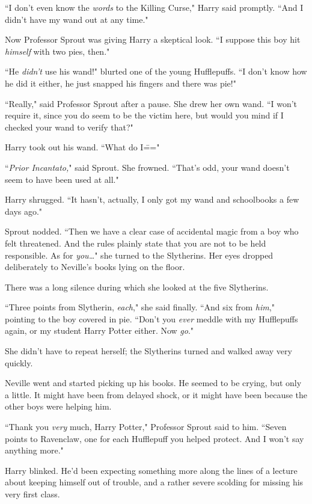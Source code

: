 ``I don't even know the \emph{words} to the Killing Curse," Harry said promptly. ``And I didn't have my wand out at any time."

Now Professor Sprout was giving Harry a skeptical look. ``I suppose this boy hit \emph{himself} with two pies, then."

``He \emph{didn't} use his wand!" blurted one of the young Hufflepuffs. ``I don't know how he did it either, he just snapped his fingers and there was pie!"

``Really," said Professor Sprout after a pause. She drew her own wand. ``I won't require it, since you do seem to be the victim here, but would you mind if I checked your wand to verify that?"

Harry took out his wand. ``What do I\==="

``\emph{Prior Incantato,}" said Sprout. She frowned. ``That's odd, your wand doesn't seem to have been used at all."

Harry shrugged. ``It hasn't, actually, I only got my wand and schoolbooks a few days ago."

Sprout nodded. ``Then we have a clear case of accidental magic from a boy who felt threatened. And the rules plainly state that you are not to be held responsible. As for \emph{you{\ldots}}" she turned to the Slytherins. Her eyes dropped deliberately to Neville's books lying on the floor.

There was a long silence during which she looked at the five Slytherins.

``Three points from Slytherin, \emph{each}," she said finally. ``And six from \emph{him}," pointing to the boy covered in pie. ``Don't you \emph{ever} meddle with my Hufflepuffs again, or my student Harry Potter either. Now \emph{go}."

She didn't have to repeat herself; the Slytherins turned and walked away very quickly.

Neville went and started picking up his books. He seemed to be crying, but only a little. It might have been from delayed shock, or it might have been because the other boys were helping him.

``Thank you \emph{very} much, Harry Potter," Professor Sprout said to him. ``Seven points to Ravenclaw, one for each Hufflepuff you helped protect. And I won't say anything more."

Harry blinked. He'd been expecting something more along the lines of a lecture about keeping himself out of trouble, and a rather severe scolding for missing his very first class.


